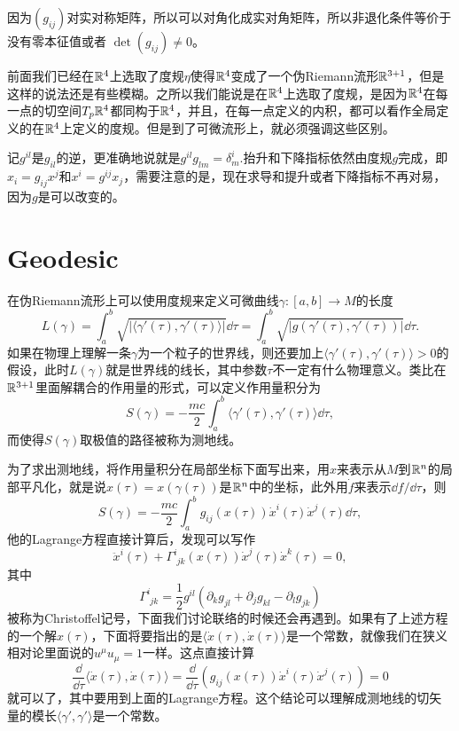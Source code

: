 因为$(g_{ij})$对实对称矩阵，所以可以对角化成实对角矩阵，所以非退化条件等价于没有零本征值或者
$\det (g_{ij})\neq 0$。

前面我们已经在$\mathbb{R}^4$上选取了度规$\eta$使得$\mathbb{R}^4$变成了一个伪Riemann流形$\mathbb{R}^{3+1}$，但是这样的说法还是有些模糊。之所以我们能说是在$\mathbb{R}^4$上选取了度规，是因为$\mathbb{R}^4$在每一点的切空间$T_p\mathbb{R}^4$都同构于$\mathbb{R}^4$，并且，在每一点定义的内积，都可以看作全局定义的在$\mathbb{R}^4$上定义的度规。但是到了可微流形上，就必须强调这些区别。

记$g^{il}$是$g_{il}$的逆，更准确地说就是$g^{il}g_{lm}=\delta^i_m$.抬升和下降指标依然由度规$g$完成，即$x_i=g_{ij}x^j$和$x^i=g^{ij}x_j$，需要注意的是，现在求导和提升或者下降指标不再对易，因为$g$是可以改变的。

\section{Geodesic}
在伪Riemann流形上可以使用度规来定义可微曲线$\gamma:[a,b]\to M$的长度
\[
	L(\gamma)=\int_a^b \sqrt{|\langle\gamma'(\tau),\gamma'(\tau)\rangle|}\dd \tau=\int_a^b \sqrt{|g(\gamma'(\tau),\gamma'(\tau))|}\dd \tau.
\]
如果在物理上理解一条$\gamma$为一个粒子的世界线，则还要加上$\langle\gamma'(\tau),\gamma'(\tau)\rangle>0$的假设，此时$L(\gamma)$就是世界线的线长，其中参数$\tau$不一定有什么物理意义。类比在$\mathbb{R}^{3+1}$里面解耦合的作用量的形式，可以定义作用量积分为
\[
	S(\gamma)=-\frac{mc}{2}\int_a^b \langle\gamma'(\tau),\gamma'(\tau)\rangle\dd \tau,
\]
而使得$S(\gamma)$取极值的路径被称为测地线。

为了求出测地线，将作用量积分在局部坐标下面写出来，用$x$来表示从$M$到$\mathbb{R}^n$的局部平凡化，就是说$x(\tau)=x(\gamma(\tau))$是$\mathbb{R}^n$中的坐标，此外用$\dot{f}$来表示$\dd f/\dd \tau$，则
\[
	S(\gamma)=-\frac{mc}{2}\int_a^b g_{ij}(x(\tau))\dot{x}^i(\tau)\dot{x}^j(\tau)\dd \tau,
\]
他的Lagrange方程直接计算后，发现可以写作
\[
	\ddot{x}^i(\tau)+\Gamma^i_{\phantom{i}jk}(x(\tau))\dot{x}^j(\tau)\dot{x}^k(\tau)=0,
\]
其中
\[
	\Gamma^i_{\phantom{i}jk}=\frac{1}{2}g^{il}(\partial_k g_{jl}+\partial_j g_{kl}-\partial_l g_{jk})
\]
被称为Christoffel记号，下面我们讨论联络的时候还会再遇到。如果有了上述方程的一个解$x(\tau)$，下面将要指出的是$\langle\dot{x}(\tau),\dot{x}(\tau)\rangle$是一个常数，就像我们在狭义相对论里面说的$u^\mu u_\mu=1$一样。这点直接计算
\[
	\frac{\dd}{\dd \tau}\langle\dot{x}(\tau),\dot{x}(\tau)\rangle=\frac{\dd}{\dd \tau}\left(g_{ij}(x(\tau))\dot{x}^i(\tau)\dot{x}^j(\tau)\right)=0
\]
就可以了，其中要用到上面的Lagrange方程。这个结论可以理解成测地线的切矢量的模长$\langle\gamma',\gamma'\rangle$是一个常数。

